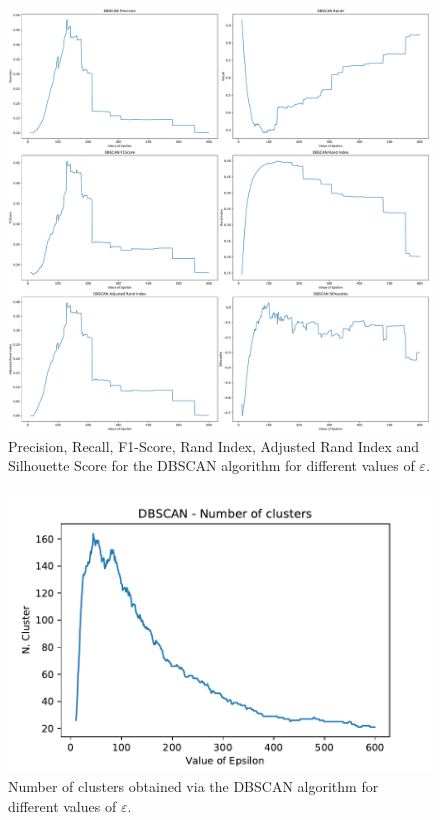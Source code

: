 \documentclass[a4paper]{article}
\begin{document}
	 \begin{figure}[H]
		\includegraphics[width=\linewidth]{dbscan_indeces.pdf}
		\caption{Precision, Recall, F1-Score, Rand Index, Adjusted Rand Index and Silhouette Score for the DBSCAN algorithm for different values of $\varepsilon$.}
		\label{fig:dbscan}
	\end{figure}
	\begin{figure}[H]
		\includegraphics[width=\linewidth]{dbscan_num_cluster.pdf}
		\caption{Number of clusters obtained via the DBSCAN algorithm for different values of $\varepsilon$.}
		\label{fig:dbscan_clusters}
	\end{figure}
\end{document}
